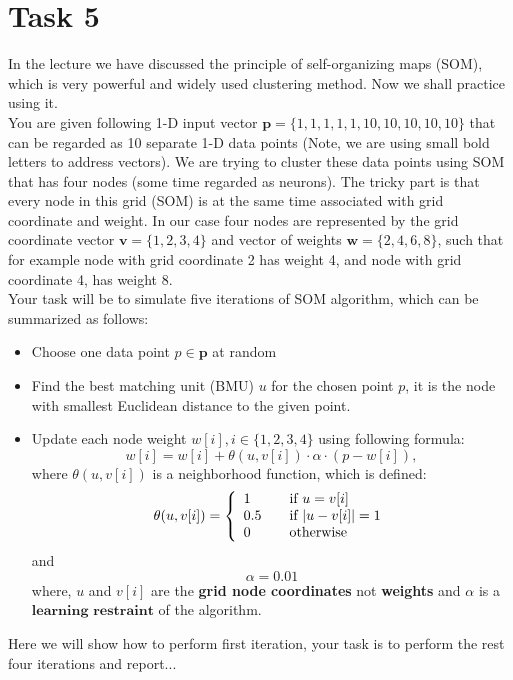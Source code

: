 \documentclass{article}
\begin{document}
\section*{Task 5}
In the lecture we have discussed the principle of self-organizing maps (SOM), which is very powerful and widely used clustering method. Now we shall practice using it.\\ You are given following 1-D input vector $\textbf{p} = \{1,1,1,1,1,10,10,10,10,10\}$ that can be regarded as 10 separate 1-D data points (Note, we are using small bold letters to address vectors). We are trying to cluster these data points using SOM that has four nodes (some time regarded as neurons). The tricky part is that every node in this grid (SOM) is at the same time associated with grid coordinate and weight. In our case four nodes are represented by the grid coordinate vector $\textbf{v} = \{1,2,3,4\}$ and vector of weights  $\textbf{w} = \{2,4,6,8\}$, such that for example node with grid coordinate 2 has weight 4, and node with grid coordinate 4, has weight 8.\\
Your task will be to simulate five iterations of SOM algorithm, which can be summarized as follows: 
\begin{itemize}
\item Choose one data point $p \in\textbf{p}$ at random
\item Find the best matching unit (BMU) $u$  for the chosen point $p$, it is the node with smallest Euclidean distance to the given point.
\item Update  each node weight $w[i], i \in \{1,2,3,4\}$ using following formula:
$$
w[i] = w[i] + \theta(u, v[i])\cdot\alpha\cdot(p - w[i]),
$$
where  $\theta(u,v[i])$ is a neighborhood function, which is defined:
\[ \theta(u, v[i]) = \left\{ 
  \begin{array}{l l}
    1 & \quad \text{if $u = v[i]$}\\
    0.5 & \quad \text{if $|u - v[i]| = 1$}\\
    0 & \quad \text{otherwise}
 \end{array} \right.\]
and
$$
\alpha = 0.01
$$
where, $u$ and $v[i]$ are the \textbf{grid node coordinates} not  \textbf{weights} and $\alpha$ is a $\textbf{learning restraint}$ of the algorithm.

\end{itemize}

Here we will show how to perform first iteration, your task is to perform the rest four iterations and report...
\end{document}
